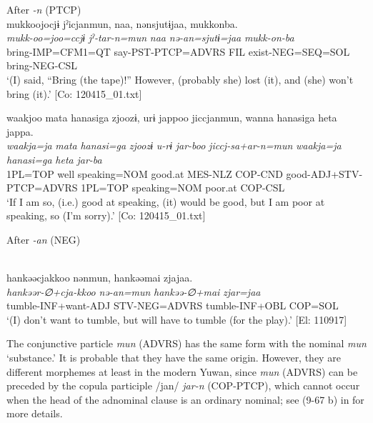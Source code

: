 \ea\label{ex:10.31}  
  \begin{xlist}
  \exi{} After \textit{{}-n} (PTCP)\\
  \ex  %
      \glll    mukkoojocjɨ  jˀicjanmun,  naa,  nənsjutɨjaa,  mukkonba.      \\
      \textit{mukk-oo=joo=ccjɨ}  \textit{jˀ-tar-n=mun}  \textit{naa}  \textit{nə-an=sjutɨ=jaa}    \textit{mukk-on-ba}      \\
      bring-IMP=CFM1=QT  say-PST-PTCP=ADVRS  FIL  exist-NEG=SEQ=SOL   bring-NEG-CSL     \\
      \glt       ‘(I) said, “Bring (the tape)!” However, (probably she) lost (it), and (she) won’t bring (it).’ [Co: 120415\_01.txt]

 \ex  %
      \glll    waakjoo  mata  hanasiga  zjoozɨ,  urɨ  jappoo  jiccjanmun,  wanna  hanasiga  {\textbar}heta{\textbar}  jappa.      \\
      \textit{waakja=ja}  \textit{mata}  \textit{hanasi=ga}  \textit{zjoozɨ}  \textit{u-rɨ}  \textit{jar-boo}   \textit{jiccj-sa+ar-n=mun}  \textit{waakja=ja}  \textit{hanasi=ga}  \textit{heta}  \textit{jar-ba}      \\
      1PL=TOP  well  speaking=NOM  good.at  MES-NLZ  COP-CND   good-ADJ+STV-PTCP=ADVRS  1PL=TOP  speaking=NOM  poor.at  COP-CSL  \\
      \glt       ‘If I am so, (i.e.) good at speaking, (it) would be good, but I am poor at speaking, so (I’m sorry).’ [Co: 120415\_01.txt]

  \exi{} After \textit{{}-an} (NEG)

  \ex\relax  [= (9-50 b)]\\
      \glll    hankəəcjakkoo  nənmun,  hankəəmai  zjajaa.\\
      \textit{hankəər-∅+cja-kkoo}  \textit{nə-an=mun}  \textit{hankəə-∅+mai}  \textit{zjar=jaa}\\
      tumble-INF+want-ADJ  STV-NEG=ADVRS  tumble-INF+OBL  COP=SOL\\
      \glt       ‘(I) don’t want to tumble, but will have to tumble (for the play).’ [El: 110917]
    \z
\z

  The conjunctive particle \textit{mun} (ADVRS) has the same form with the nominal \textit{mun} ‘substance.’ It is probable that they have the same origin. However, they are different morphemes at least in the modern Yuwan, since \textit{mun} (ADVRS) can be preceded by the copula participle /jan/ \textit{jar-n} (COP-PTCP), which cannot occur when the head of the adnominal clause is an ordinary nominal; see (9-67 b) in  for more details.


\end{xlist}
